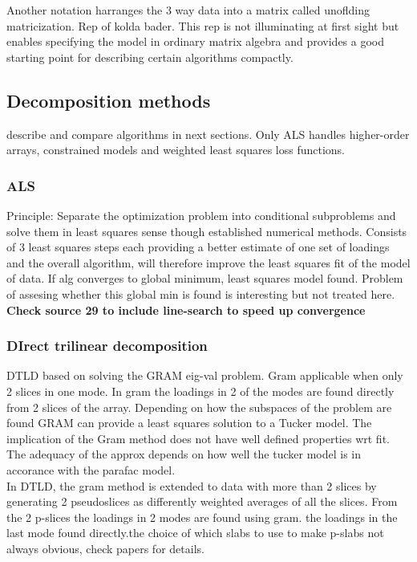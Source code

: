 \documentclass[10pt, draft]{article}
\begin{document}
Another notation harranges the 3 way data into a matrix called unoflding matricization. Rep of kolda bader.  This rep is not illuminating at first sight but enables specifying the model in ordinary matrix algebra and provides a good starting point for describing certain algorithms compactly.

\subsection{Decomposition methods}

describe and compare algorithms  in next sections. Only ALS handles higher-order arrays, constrained models and weighted least squares loss functions.  

\subsubsection{ALS}
Principle: Separate the optimization problem into conditional subproblems and solve them in least squares sense though established numerical methods.  
Consists of 3 least squares steps each providing a better estimate of one set of loadings and the overall algorithm, will therefore improve the least squares fit of the model of data.  If alg converges to global minimum, least squares model found.  Problem of assesing whether this global min is found is interesting but not treated here. \\
\textbf{Check source 29 to include line-search to speed up convergence}

\subsubsection{DIrect trilinear decomposition}
DTLD based on solving the GRAM eig-val problem.  Gram applicable when only 2 slices in one mode.  In gram the loadings in 2 of the modes are found directly from 2 slices of the array. Depending on how the subspaces of the problem are found GRAM can provide a least squares solution to a Tucker model.  The implication of the Gram method does not have well defined properties wrt fit.  The adequacy of the approx depends on how well the tucker model is in accorance with the parafac model.  \\
In DTLD, the gram method is extended to data with more than 2 slices by generating 2 pseudoslices as differently weighted averages of all the slices.  From the 2 p-slices the loadings in 2 modes are found using gram.  the loadings in the last mode found directly.the choice of which slabs to use to make p-slabs not always obvious, check papers for details.
\end{document}
